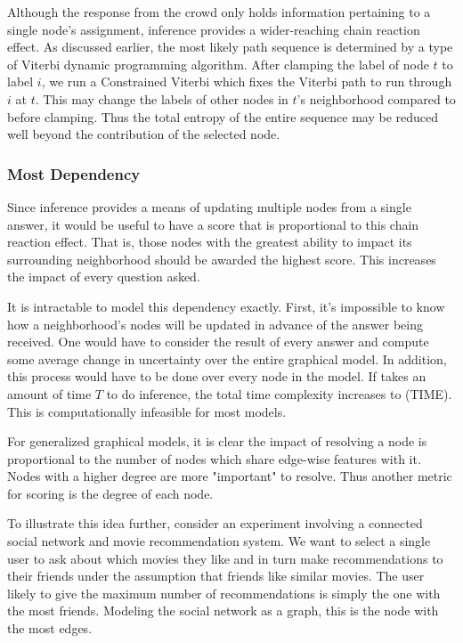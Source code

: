 Although the response from the crowd only holds information pertaining to a single node's assignment, inference provides a wider-reaching chain reaction effect.  As discussed earlier, the most likely path sequence is determined by a type of Viterbi dynamic programming algorithm.  After clamping the label of node $t$ to label $i$, we run a Constrained Viterbi \cite{Kristjansson:2004:IIE:1597148.1597216} which fixes the Viterbi path to run through $i$ at $t$.  This may change the labels of other nodes in $t$'s neighborhood compared to before clamping.  Thus the total entropy of the entire sequence may be reduced well beyond the contribution of the selected node.

\subsubsection{Most Dependency}
Since inference provides a means of updating multiple nodes from a single answer, it would be useful to have a score that is proportional to this chain reaction effect.  That is, those nodes with the greatest ability to impact its surrounding neighborhood should be awarded the highest score.  This increases the impact of every question asked. 

It is intractable to model this dependency exactly.  First, it's impossible to know how a neighborhood's nodes will be updated in advance of the answer being received.  One would have to consider the result of every answer and compute some average change in uncertainty over the entire graphical model.  In addition, this process would have to be done over every node in the model.  If takes an amount of time $T$ to do inference, the total time complexity increases to (TIME).  This is computationally infeasible for most models.

For generalized graphical models, it is clear the impact of resolving a node is proportional to the number of nodes which share edge-wise features with it.  Nodes with a higher degree are more "important" to resolve.  Thus another metric for scoring is the degree of each node.

To illustrate this idea further, consider an experiment involving a connected social network and movie recommendation system.  We want to select a single user to ask about which movies they like and in turn make recommendations to their friends under the assumption that friends like similar movies.  The user likely to give the maximum number of recommendations is simply the one with the most friends.  Modeling the social network as a graph, this is the node with the most edges.

